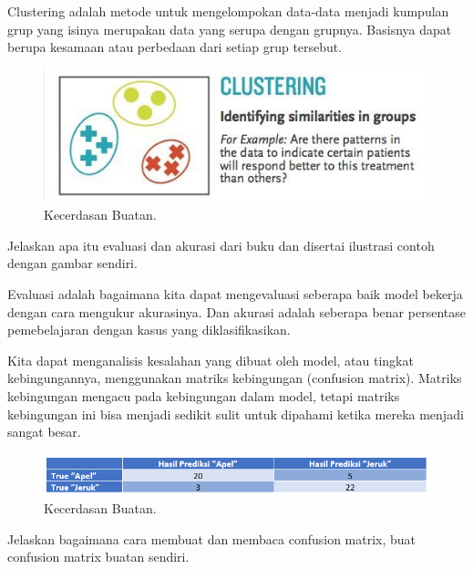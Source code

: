 \noindent
Clustering adalah  metode untuk mengelompokan data-data menjadi kumpulan grup yang isinya merupakan data yang serupa dengan grupnya. Basisnya dapat berupa kesamaan atau perbedaan dari setiap grup tersebut.

\hfill\break
\begin{figure}[H]
    \includegraphics[width=1\textwidth]{figures/1174006/chapter2/teori/4.png}
    \centering
    \caption{Kecerdasan Buatan.}
\end{figure}

\noindent
Jelaskan  apa  itu  evaluasi  dan  akurasi  dari  buku  dan  disertai  ilustrasi  contoh dengan gambar sendiri.

\noindent
Evaluasi adalah bagaimana kita dapat mengevaluasi seberapa baik model bekerja dengan cara mengukur akurasinya. Dan akurasi adalah seberapa benar persentase pemebelajaran dengan kasus yang diklasifikasikan. 

\noindent
Kita dapat menganalisis kesalahan yang dibuat oleh model, atau tingkat kebingungannya, menggunakan matriks kebingungan (confusion matrix). Matriks kebingungan mengacu pada kebingungan dalam model, tetapi matriks kebingungan ini bisa menjadi sedikit sulit untuk dipahami ketika mereka menjadi sangat besar.

\hfill\break
\begin{figure}[H]
    \includegraphics[width=1\textwidth]{figures/1174006/chapter2/teori/5.png}
    \centering
    \caption{Kecerdasan Buatan.}
\end{figure}

\noindent
Jelaskan bagaimana cara membuat dan membaca confusion matrix, buat confusion matrix buatan sendiri.

